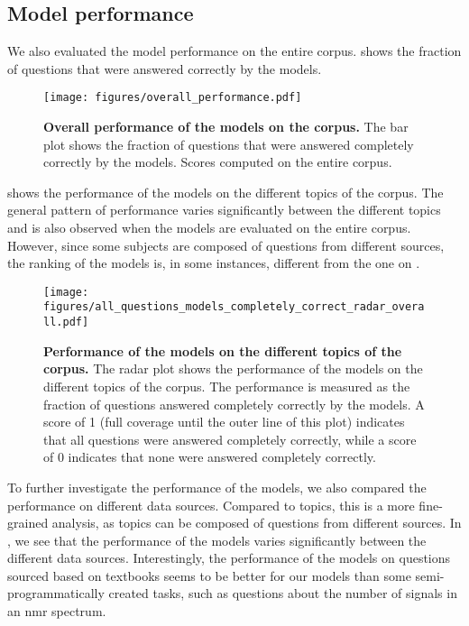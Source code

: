 \normalsize


\clearpage
\subsection{Model performance} \label{sec:model_performance_app}
We also evaluated the model performance on the entire \chembench corpus.
 shows the fraction of questions that were answered correctly by the models.

\begin{figure}[htb]
    \centering
    \texttt{[image: figures/overall\_performance.pdf]}
    \caption{\textbf{Overall performance of the models on the \chembench corpus.} The bar plot shows the fraction of questions that were answered completely correctly by the models. Scores computed on the entire \chembench corpus.}
    \label{fig:barplot_all_correct_all_questions}
\end{figure}

 shows the performance of the models on the different topics of the \chembench corpus.
The general pattern of performance varies significantly between the different topics and is also observed when the models are evaluated on the entire corpus.
However, since some subjects are composed of questions from different sources, the ranking of the models is, in some instances, different from the one on \chembenchmini.

\begin{figure}[htb]
    \centering
    \texttt{[image: figures/all\_questions\_models\_completely\_correct\_radar\_overall.pdf]}
    \caption{\textbf{Performance of the models on the different topics of the \chembench corpus.} The radar plot shows the performance of the models on the different topics of the \chembench corpus. The performance is measured as the fraction of questions answered completely correctly by the models.
    A score of 1 (full coverage until the outer line of this plot) indicates that all questions were answered completely correctly, while a score of 0 indicates that none were answered completely correctly.
    }
    \label{fig:all_questions_models_completely_correct_radar_overall}
\end{figure}




To further investigate the performance of the models, we also compared the performance on different data sources.
Compared to topics, this is a more fine-grained analysis, as topics can be composed of questions from different sources.
In , we see that the performance of the models varies significantly between the different data sources.
Interestingly, the performance of the models on questions sourced based on textbooks seems to be better for our models than some semi-programmatically created tasks, such as questions about the number of signals in an \gls{nmr} spectrum.


